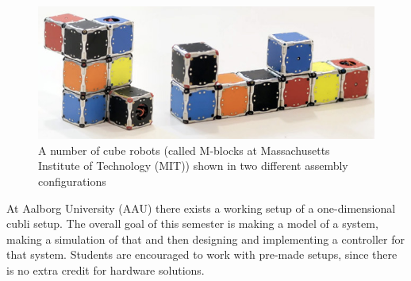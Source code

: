 \begin{figure}[H] 
	\centering 
	\includegraphics[scale=0.4]{figures/m-blocks}
	\caption{A number of cube robots (called M-blocks at Massachusetts Institute of Technology (MIT)) shown in two different assembly configurations\cite{LRosen}}
	\label{MBlocksExample}
\end{figure} 
At Aalborg University (AAU) there exists a working setup of a one-dimensional cubli setup. The overall goal of this semester is making a model of a system, making a simulation of that and then designing and implementing a controller for that system. Students are encouraged to work with pre-made setups, since there is no extra credit for hardware solutions.





